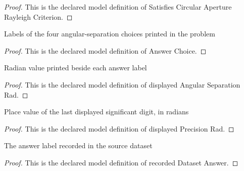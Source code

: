 \begin{proof}
  This is the declared model definition of Satisfies Circular Aperture Rayleigh Criterion.
\end{proof}
\begin{definition}
  \label{def:physics:phyx-mini-0132:phyxminiproblems-problemphyxmini0132-answerchoice}
  Labels of the four angular-separation choices printed in the problem
\end{definition}
\begin{proof}
  This is the declared model definition of Answer Choice.
\end{proof}
\begin{definition}
  \label{def:physics:phyx-mini-0132:phyxminiproblems-problemphyxmini0132-displayedangularseparationrad}
  Radian value printed beside each answer label
\end{definition}
\begin{proof}
  This is the declared model definition of displayed Angular Separation Rad.
\end{proof}
\begin{definition}
  \label{def:physics:phyx-mini-0132:phyxminiproblems-problemphyxmini0132-displayedprecisionrad}
  Place value of the last displayed significant digit, in radians
\end{definition}
\begin{proof}
  This is the declared model definition of displayed Precision Rad.
\end{proof}
\begin{definition}
  \label{def:physics:phyx-mini-0132:phyxminiproblems-problemphyxmini0132-recordeddatasetanswer}
  The answer label recorded in the source dataset
\end{definition}
\begin{proof}
  This is the declared model definition of recorded Dataset Answer.
\end{proof}
